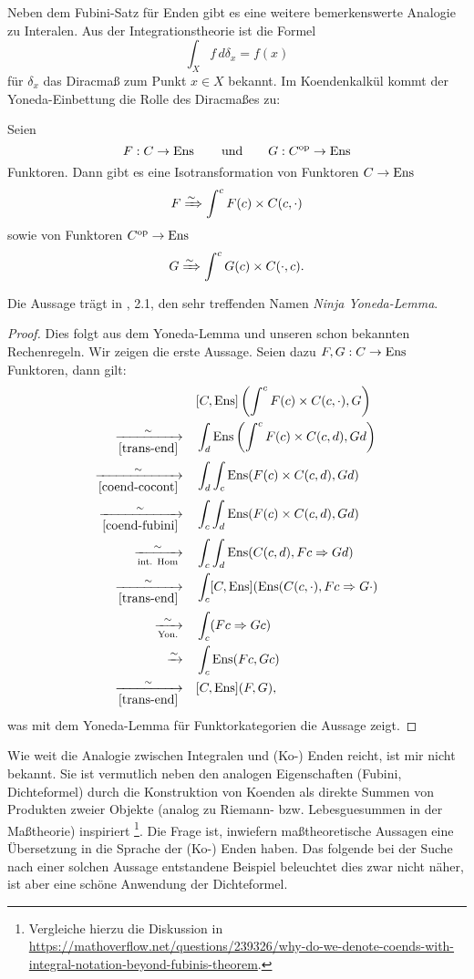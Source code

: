 Neben dem Fubini-Satz für Enden gibt es eine weitere bemerkenswerte
Analogie zu Interalen. Aus der Integrationstheorie ist die Formel
\[ \int_X f \, d\delta_x = f(x) \]
für $\delta_x$ das Diracmaß zum Punkt $x \in X$ bekannt. Im
Koendenkalkül kommt der Yoneda-Einbettung die Rolle des Diracmaßes zu:
\begin{prop} \label{coend-density}
  Seien
  \[ F: C \to \operatorname{Ens} \qquad \text{und} \qquad G: C^\mathrm{op} \to \operatorname{Ens} \]
  Funktoren. Dann gibt es eine Isotransformation von Funktoren $C \to
  \operatorname{Ens}$
  \[ F \xRightarrow{\sim} \int^c F(c) \times C(c, \cdot) \]
  sowie von Funktoren $C^\mathrm{op} \to \operatorname{Ens}$
  \[ G \xRightarrow{\sim} \int^c G(c) \times C(\cdot, c). \]
\end{prop}
\begin{bem}
  Die Aussage trägt in \cite{Lore}, 2.1, den sehr treffenden Namen
  \emph{Ninja Yoneda-Lemma}.
\end{bem}
\begin{proof}
  Dies folgt aus dem Yoneda-Lemma und unseren schon bekannten
  Rechenregeln. Wir zeigen die erste Aussage. Seien dazu $F, G: C \to
  \operatorname{Ens}$ Funktoren, dann gilt:
  \begin{align*}
    &[C, \operatorname{Ens}] \left( \int^c F(c) \times C(c, \cdot), G \right) \\
    \xrightarrow[\ref{trans-end}]{\sim} \quad
    &\int_d \operatorname{Ens} \left( \int^c F(c) \times C(c, d), Gd \right) \\
    \xrightarrow[\ref{coend-cocont}]{\sim} \quad
    &\int_d \int_c \operatorname{Ens}(F(c) \times C(c, d), Gd) \\
    \xrightarrow[\ref{coend-fubini}]{\sim} \quad
    &\int_c \int_d \operatorname{Ens}(F(c) \times C(c, d), Gd) \\
    \xrightarrow[\text{int. Hom}]{\sim} \quad
    &\int_c \int_d \operatorname{Ens}(C(c, d), Fc \Rightarrow Gd) \\
    \xrightarrow[\ref{trans-end}]{\sim} \quad
    &\int_c [C, \operatorname{Ens}](\operatorname{Ens}(C(c, \cdot), Fc \Rightarrow G \cdot) \\
    \xrightarrow[\text{Yon.}]{\sim} \quad
    &\int_c (Fc \Rightarrow Gc) \\
    \xrightarrow[]{\sim} \quad &\int_c \operatorname{Ens}(Fc, Gc) \\
    \xrightarrow[\ref{trans-end}]{\sim} \quad
    &[C, \operatorname{Ens}](F, G),
  \end{align*}  
  was mit dem Yoneda-Lemma für Funktorkategorien die Aussage zeigt.
\end{proof}
\begin{bem}
  Wie weit die Analogie zwischen Integralen und (Ko-) Enden reicht,
  ist mir nicht bekannt. Sie ist vermutlich neben den analogen
  Eigenschaften (Fubini, Dichteformel) durch die Konstruktion von
  Koenden als direkte Summen von Produkten zweier Objekte (analog zu
  Riemann- bzw. Lebesguesummen in der Maßtheorie)
  inspiriert
  \footnote{Vergleiche hierzu die Diskussion in
    \url{https://mathoverflow.net/questions/239326/why-do-we-denote-coends-with-integral-notation-beyond-fubinis-theorem}.}.
  Die Frage ist, inwiefern maßtheoretische Aussagen eine Übersetzung
  in die Sprache der (Ko-) Enden haben. Das folgende bei der Suche
  nach einer solchen Aussage entstandene Beispiel beleuchtet dies zwar
  nicht näher, ist aber eine schöne Anwendung der Dichteformel.
\end{bem}
